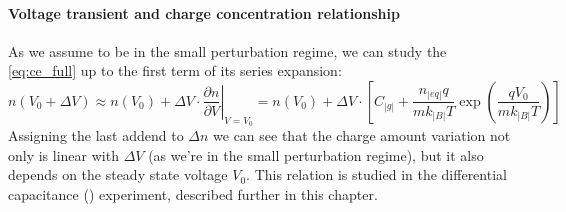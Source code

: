 	\paragraph{Voltage transient and charge concentration relationship}
	As we assume to be in the small perturbation regime, we can study the \cref{eq:ce_full} up to the first term of its series expansion:
	\begin{dmath}
		n(V_0 + \Delta V) \approx n(V_0) + \Delta V \cdot \left.\frac{\partial n}{\partial V}\right\rvert_{V=V_0} = n(V_0) + \Delta V \cdot \left[C_|g| + \frac{n_|eq| q}{mk_|B|T}\exp(\frac{qV_0}{mk_|B|T})\right]
	\end{dmath}
	Assigning the last addend to $\Delta n$ we can see that the charge amount variation not only is linear with $\Delta V$ (as we're in the small perturbation regime), but it also depends on the steady state voltage $V_0$.
	This relation is studied in the differential capacitance () experiment, described further in this chapter.

